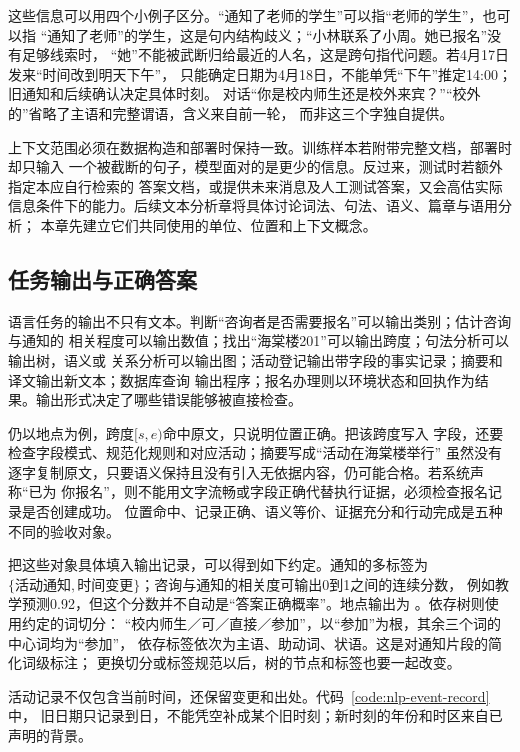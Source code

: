 这些信息可以用四个小例子区分。“通知了老师的学生”可以指“老师的学生”，也可以指
“通知了老师”的学生，这是句内结构歧义；“小林联系了小周。她已报名”没有足够线索时，
“她”不能被武断归给最近的人名，这是跨句指代问题。若4月17日发来“时间改到明天下午”，
只能确定日期为4月18日，不能单凭“下午”推定14:00；旧通知和后续确认决定具体时刻。
对话“你是校内师生还是校外来宾？”“校外的”省略了主语和完整谓语，含义来自前一轮，
而非这三个字独自提供。

上下文范围必须在数据构造和部署时保持一致。训练样本若附带完整文档，部署时却只输入
一个被截断的句子，模型面对的是更少的信息。反过来，测试时若额外指定本应自行检索的
答案文档，或提供未来消息及人工测试答案，又会高估实际信息条件下的能力。后续文本分析章将具体讨论词法、句法、语义、篇章与语用分析；
本章先建立它们共同使用的单位、位置和上下文概念。

\subsection{任务输出与正确答案}
\label{sec:nlp-outputs-and-correctness}

语言任务的输出不只有文本。判断“咨询者是否需要报名”可以输出类别；估计咨询与通知的
相关程度可以输出数值；找出“海棠楼201”可以输出跨度；句法分析可以输出树，语义或
关系分析可以输出图；活动登记输出带字段的事实记录；摘要和译文输出新文本；数据库查询
输出程序；报名办理则以环境状态和回执作为结果。输出形式决定了哪些错误能够被直接检查。

仍以地点为例，跨度$[s,e)$命中原文，只说明位置正确。把该跨度写入
字段，还要检查字段模式、规范化规则和对应活动；摘要写成“活动在海棠楼举行”
虽然没有逐字复制原文，只要语义保持且没有引入无依据内容，仍可能合格。若系统声称“已为
你报名”，则不能用文字流畅或字段正确代替执行证据，必须检查报名记录是否创建成功。
位置命中、记录正确、语义等价、证据充分和行动完成是五种不同的验收对象。

把这些对象具体填入输出记录，可以得到如下约定。通知的多标签为
$\{\text{活动通知},\text{时间变更}\}$；咨询与通知的相关度可输出0到1之间的连续分数，
例如教学预测0.92，但这个分数并不自动是“答案正确概率”。地点输出为
\code{type=LOC, span=[39,45), text=海棠楼201}。依存树则使用约定的词切分：
“校内师生／可／直接／参加”，以“参加”为根，其余三个词的中心词均为“参加”，
依存标签依次为主语、助动词、状语。这是对通知片段的简化词级标注；
更换切分或标签规范以后，树的节点和标签也要一起改变。

活动记录不仅包含当前时间，还保留变更和出处。代码~\ref{code:nlp-event-record}中，
旧日期只记录到日，不能凭空补成某个旧时刻；新时刻的年份和时区来自已声明的背景。

